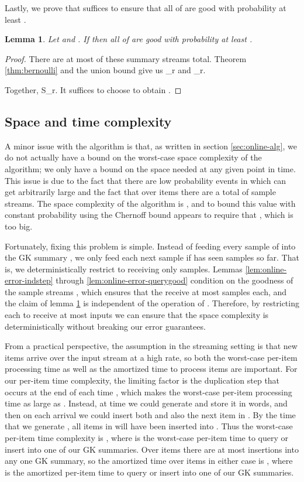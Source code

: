 \documentclass{article}
\theoremstyle{plain}
\newtheorem{lemma}[theorem]{Lemma}
\newcommand{\eva}[1]{\alpha_{#1}}
\newcommand{\evb}[1]{\beta_{#1}}
\begin{document}
Lastly, we prove that  suffices to ensure that all of
  are good with
probability at least .

\begin{lemma}
  \label{lem:online-error-goodprob}
  Let  and . If  then all of  are good with probability at least .
\end{lemma}
\begin{proof}
  There are at most  of these summary
  streams total. Theorem \ref{thm:bernoulli} and the union bound give us
  \eva{r} and
  \evb{r}.

  Together, S_r. It suffices to choose  to obtain .
\end{proof}



\subsection{Space and time complexity}
\label{sec:online-spacetime}

A minor issue with the algorithm is that, as written in section
\ref{sec:online-alg}, we do not actually have a bound on the worst-case space
complexity of the algorithm; we only have a bound on the space needed at any
given point in time. This issue is due to the fact that there are low
probability events in which  can get arbitrarily large and the fact
that over  items there are a total of  sample streams. The space
complexity of the algorithm is , and to bound this value
with constant probability using the Chernoff bound appears to require that , which is too big.

Fortunately, fixing this problem is simple. Instead of feeding every sample of
 into the GK summary , we only feed each next sample if  has seen
 samples so far. That is, we deterministically restrict  to
receiving only  samples. Lemmas \ref{lem:online-error-indstep} through
\ref{lem:online-error-querygood} condition on the goodness of the sample streams
, which ensures that the  receive at most  samples each, and the
claim of lemma \ref{lem:online-error-goodprob} is independent of the operation
of . Therefore, by restricting each  to receive at most  inputs
we can ensure that the space complexity is deterministically  without breaking our error guarantees.

From a practical perspective, the assumption in the streaming setting is that
new items arrive over the input stream  at a high rate, so both the
worst-case per-item processing time as well as the amortized time to process 
items are important. For our per-item time complexity, the limiting factor is
the duplication step that occurs at the end of each time ,
which makes the worst-case per-item processing time as large as .
Instead, at time  we could generate  and store it in 
words, and then on each arrival  we could
insert both  and also the next item in . By the time 
that we generate , all items in  will have been inserted into .
Thus the worst-case per-item time complexity is , where  is the
worst-case per-item time to query or insert into one of our GK summaries.
Over  items there are at most  insertions into any one GK
summary, so the amortized time over  items in either case is , where  is the amortized
per-item time to query or insert into one of our GK summaries.
\end{document}
